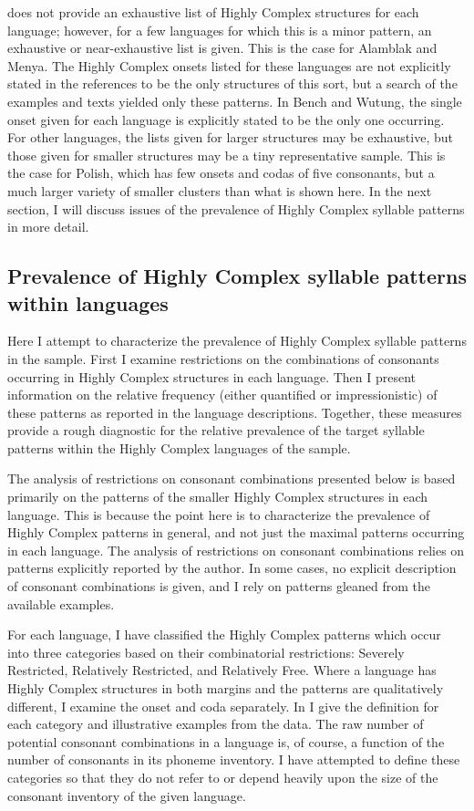    does not provide an exhaustive list of Highly Complex structures for each language; however, for a few languages for which this is a minor pattern, an exhaustive or near-exhaustive list is given. This is the case for Alamblak and Menya. The Highly Complex onsets listed for these languages are not explicitly stated in the references to be the only structures of this sort, but a search of the examples and texts yielded only these patterns. In Bench and Wutung, the single onset given for each language is explicitly stated to be the only one occurring. For other languages, the lists given for larger structures may be exhaustive, but those given for smaller structures may be a tiny representative sample. This is the case for Polish, which has few onsets and codas of five consonants, but a much larger variety of smaller clusters than what is shown here. In the next section, I will discuss issues of the prevalence of Highly Complex syllable patterns in more detail.

\subsection{Prevalence of Highly Complex syllable patterns within languages}\label{sec:3.4.2}

  Here I attempt to characterize the prevalence of Highly Complex syllable patterns in the sample. First I examine restrictions on the combinations of consonants occurring in Highly Complex structures in each language. Then I present information on the relative frequency (either quantified or impressionistic) of these patterns as reported in the language descriptions. Together, these measures provide a rough diagnostic for the relative prevalence of the target syllable patterns within the Highly Complex languages of the sample.

  The analysis of restrictions on consonant combinations presented below is based primarily on the patterns of the smaller Highly Complex structures in each language. This is because the point here is to characterize the prevalence of Highly Complex patterns in general, and not just the maximal patterns occurring in each language. The analysis of restrictions on consonant combinations relies on patterns explicitly reported by the author. In some cases, no explicit description of consonant combinations is given, and I rely on patterns gleaned from the available examples. 

  For each language, I have classified the Highly Complex patterns which occur into three categories based on their combinatorial restrictions: Severely Restricted, Relatively Restricted, and Relatively Free. Where a language has Highly Complex structures in both margins and the patterns are qualitatively different, I examine the onset and coda separately. In  I give the definition for each category and illustrative examples from the data. The raw number of potential consonant combinations in a language is, of course, a function of the number of consonants in its phoneme inventory. I have attempted to define these categories so that they do not refer to or depend heavily upon the size of the consonant inventory of the given language.

